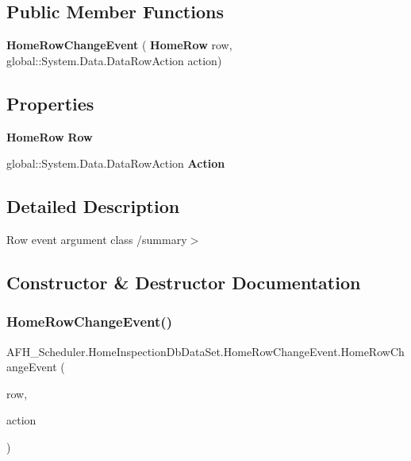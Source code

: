 \subsection*{Public Member Functions}
\begin{DoxyCompactItemize}
\item 
\textbf{ Home\+Row\+Change\+Event} (\textbf{ Home\+Row} row, global\+::\+System.\+Data.\+Data\+Row\+Action action)
\end{DoxyCompactItemize}
\subsection*{Properties}
\begin{DoxyCompactItemize}
\item 
\textbf{ Home\+Row} \textbf{ Row}\hspace{0.3cm}{\ttfamily  [get]}
\item 
global\+::\+System.\+Data.\+Data\+Row\+Action \textbf{ Action}\hspace{0.3cm}{\ttfamily  [get]}
\end{DoxyCompactItemize}


\subsection{Detailed Description}
Row event argument class /summary$>$ 

\subsection{Constructor \& Destructor Documentation}
\mbox{\label{class_a_f_h___scheduler_1_1_home_inspection_db_data_set_1_1_home_row_change_event_aba2df0b894c3107fa717a794de2441a6}} 
\subsubsection{HomeRowChangeEvent()}
{\footnotesize\ttfamily A\+F\+H\+\_\+\+Scheduler.\+Home\+Inspection\+Db\+Data\+Set.\+Home\+Row\+Change\+Event.\+Home\+Row\+Change\+Event (\begin{DoxyParamCaption}\item[{\textbf{ Home\+Row}}]{row,  }\item[{global\+::\+System.\+Data.\+Data\+Row\+Action}]{action }\end{DoxyParamCaption})}




